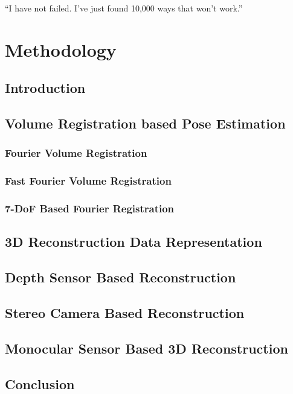 \begin{savequote}[8cm]
  ``I have not failed. I've just found 10,000 ways that won't work.''
\end{savequote}
\makeatletter
\chapter{Methodology}

\section{Introduction}

\section{Volume Registration based Pose Estimation}

\subsection{Fourier Volume Registration}

\subsection{Fast Fourier Volume Registration}

\subsection{7-DoF Based Fourier Registration}

\section{3D Reconstruction Data Representation}

\section{Depth Sensor Based Reconstruction}

\section{Stereo Camera Based Reconstruction}

\section{Monocular Sensor Based 3D Reconstruction}



\section{Conclusion}